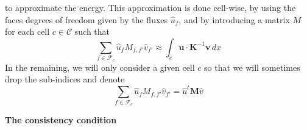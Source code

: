 \documentclass[11pt]{amsart}
\newcommand{\vect}[1]{\boldsymbol{#1}}
\newcommand{\mat}[1]{\boldsymbol{#1}}
\newcommand{\Fcal}{\mathcal{F}}
\newcommand{\Ccal}{\mathcal{C}}
\begin{document}
to approximate the energy. This approximation is done cell-wise, by using the faces degrees of
freedom given by the fluxes $\hat{u}_f$, and by introducing a matrix $M$ for each cell $c\in\Ccal$ such
that
\begin{equation}
  \label{eq:defM}
  \sum_{f\in \Fcal_c} \hat{u}_f M_{f,f'} \hat{v}_{f'} \approx \int_{c} \vect{u}\cdot\mat{K}^{-1}\vect{v}\,dx
\end{equation}
In the remaining, we will only consider a given cell $c$ so that we will sometimes drop the
sub-indices and denote
\begin{equation*}
  \sum_{f\in \Fcal_c} \hat{u}_f M_{f,f'} \hat{v}_{f'} = \hat{u}^t\vect{M}\hat{v}
\end{equation*}

\textbf{The consistency condition}
\end{document}
